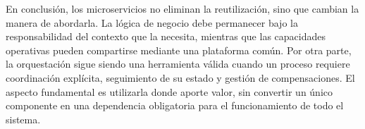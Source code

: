 En conclusión, los microservicios no eliminan la reutilización, sino que cambian la manera de abordarla. La lógica de negocio debe permanecer bajo la responsabilidad del contexto que la necesita, mientras que las capacidades operativas pueden compartirse mediante una plataforma común. Por otra parte, la orquestación sigue siendo una herramienta válida cuando un proceso requiere coordinación explícita, seguimiento de su estado y gestión de compensaciones. El aspecto fundamental es utilizarla donde aporte valor, sin convertir un único componente en una dependencia obligatoria para el funcionamiento de todo el sistema.

